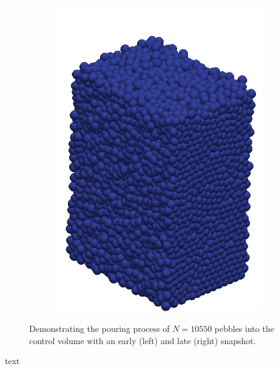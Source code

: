 \begin{figure}[t]
\begin{subfigure}[b]{0.23\textwidth}
		\includegraphics[width=\textwidth]{chapters/figures/fill03.png}
	\end{subfigure}
	\caption{Demonstrating the pouring process of $N = 10550$ pebbles into the control volume with an early (left) and late (right) snapshot.}
\label{fig:fill01}
\end{figure}

text


